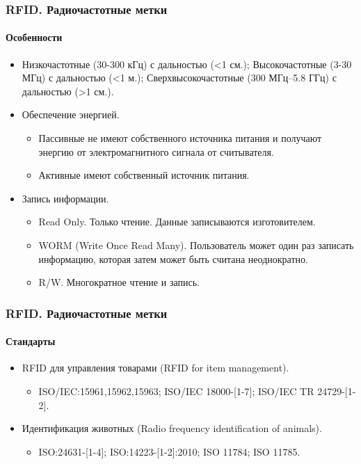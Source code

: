 \begin{frame}
\frametitle{RFID. Радиочастотные метки}
\framesubtitle{Особенности}
\begin{itemize}
    \item Низкочастотные (30-300 кГц) с дальностью (<1 см.); Высокочастотные (3-30 МГц) с дальностью (<1 м.); Сверхвысокочастотные (300 МГц--5.8 ГГц) с дальностью (>1 см.).
    \item Обеспечение энергией.
    \begin{itemize}
        \item Пассивные не имеют собственного источника питания и 
            получают энергию от электромагнитного сигнала от считывателя.
        \item Активные имеют собственный источник питания.
    \end{itemize}
    \item Запись информации.
    \begin{itemize}
        \item Read Only. Только чтение. Данные записываются изготовителем.
        \item WORM (Write Once Read Many). Пользователь может один раз записать информацию, 
            которая затем может быть считана неоднократно.
        \item R/W. Многократное чтение и запись.
    \end{itemize}
\end{itemize}
\end{frame}
\begin{frame}


\frametitle{RFID. Радиочастотные метки}
\framesubtitle{Стандарты}
\begin{itemize}
    \item RFID для управления товарами (RFID for item management).
    \begin{itemize}
        \item ISO/IEC:15961,15962,15963; ISO/IEC 18000-[1-7]; ISO/IEC TR 24729-[1-2].
    \end{itemize}
    
    \item Идентификация животных (Radio frequency identification of animals).
    \begin{itemize}
        \item ISO:24631-[1-4]; ISO:14223-[1-2]:2010; ISO 11784; ISO 11785.
    \end{itemize}
\end{itemize}
\end{frame}


